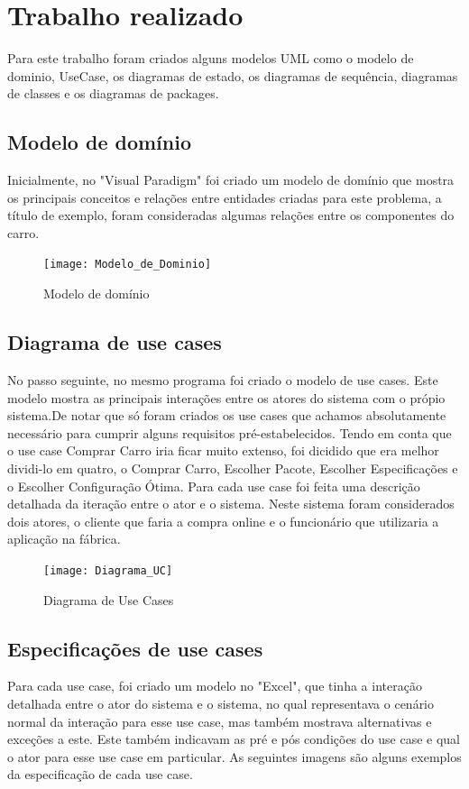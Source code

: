 \documentclass[10pt, a4paper]{report}
\begin{document}
\newpage
\chapter{Trabalho realizado}\label{trabalho}
Para este trabalho foram criados alguns modelos UML como o modelo de dominio, UseCase, os diagramas de estado, os diagramas de sequência, diagramas de classes e os diagramas de packages.


\section{Modelo de domínio}
Inicialmente, no "Visual Paradigm" foi criado um modelo de domínio que mostra os principais conceitos e relações entre entidades criadas para este problema, a título de exemplo, foram consideradas algumas relações entre os componentes do carro.
\begin{figure}[!htb]
\centering
\texttt{[image: Modelo\_de\_Dominio]}
\caption{Modelo de domínio}
\label{MD}
\end{figure}


\section{Diagrama de use cases}
No passo seguinte, no mesmo programa foi criado o modelo de use cases. Este modelo mostra as principais interações entre os atores do sistema com o própio sistema.De notar que só foram criados os use cases que achamos absolutamente necessário para cumprir alguns requisitos pré-estabelecidos. Tendo em conta que o use case Comprar Carro iria ficar muito extenso, foi dicidido que era melhor dividi-lo em quatro, o Comprar Carro, Escolher Pacote, Escolher Especificações e o Escolher Configuração Ótima. Para cada use case foi feita uma descrição detalhada da iteração entre o ator e o sistema. Neste sistema foram considerados dois atores, o cliente que faria a compra online e o funcionário que utilizaria a aplicação na fábrica.

\begin{figure}[!htb]
\centering
\texttt{[image: Diagrama\_UC]}
\caption{Diagrama de Use Cases}
\label{Diagrama UC}
\end{figure}


\newpage
\section{Especificações de use cases}
Para cada use case, foi criado um modelo no "Excel", que tinha a interação detalhada entre o ator do sistema e o sistema, no qual representava o cenário normal da interação para esse use case, mas também mostrava alternativas e exceções a este. Este também indicavam as pré e pós condições do use case e qual o ator para esse use case em particular. As seguintes imagens são alguns exemplos da especificação de cada use case.
\end{document}
